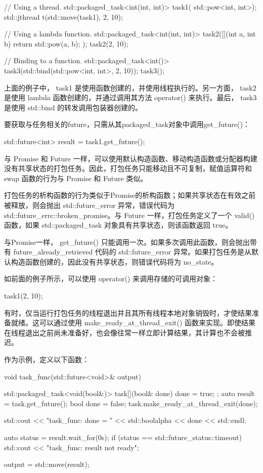 \begin{cpp}
// Using a thread.
std::packaged_task<int(int, int)> task1(
                       std::pow<int, int>);
std::jthread t(std::move(task1), 2, 10);

// Using a lambda function.
std::packaged_task<int(int, int)> task2([](int a, int b)
{
    return std::pow(a, b);
});
task2(2, 10);

// Binding to a function.
std::packaged_task<int()> task3(std::bind(std::pow<int, int>, 2, 10));
task3();
\end{cpp}

上面的例子中， task1 是使用函数创建的，并使用线程执行的。另一方面， task2 是使用 lambda 函数创建的，并通过调用其方法 operator() 来执行。最后， task3 是使用 std::bind 的转发调用包装器创建的。

要获取与任务相关的future，只需从其packaged\_task对象中调用get\_future()：

\begin{cpp}
std::future<int> result = task1.get_future();
\end{cpp}

与 Promise 和 Future 一样，可以使用默认构造函数、移动构造函数或分配器构建没有共享状态的打包任务。因此，打包任务只能移动且不可复制，赋值运算符和 swap 函数的行为与 Promise 和 Future 类似。

打包任务的析构函数的行为类似于Promise的析构函数；如果共享状态在有效之前被释放，则会抛出 std::future\_error 异常，错误代码为 std::future\_errc::broken\_promise。与 Future 一样，打包任务定义了一个 valid() 函数，如果 std::packaged\_task 对象具有共享状态，则该函数返回 true。

与Promise一样， get\_future() 只能调用一次。如果多次调用此函数，则会抛出带有 future\_already\_retrieved 代码的 std::future\_error 异常。如果打包任务是从默认构造函数创建的，因此没有共享状态，则错误代码将为 no\_state。

如前面的例子所示，可以使用 operator() 来调用存储的可调用对象：

\begin{cpp}
task1(2, 10);
\end{cpp}

有时，仅当运行打包任务的线程退出并且其所有线程本地对象销毁时，才使结果准备就绪。这可以通过使用 make\_ready\_at\_thread\_exit() 函数来实现。即使结果在线程退出之前尚未准备好，也会像往常一样立即计算结果，其计算也不会被推迟。

作为示例，定义以下函数：

\begin{cpp}
void task_func(std::future<void>& output) {
    std::packaged_task<void(bool&)> task{[](bool& done){
            done = true;
    }};
    auto result = task.get_future();
    bool done = false;
    task.make_ready_at_thread_exit(done);

    std::cout << "task_func: done = "
              << std::boolalpha << done << std::endl;

    auto status = result.wait_for(0s);
    if (status == std::future_status::timeout)
        std::cout << "task_func: result not ready\n";

    output = std::move(result);
}
\end{cpp}

